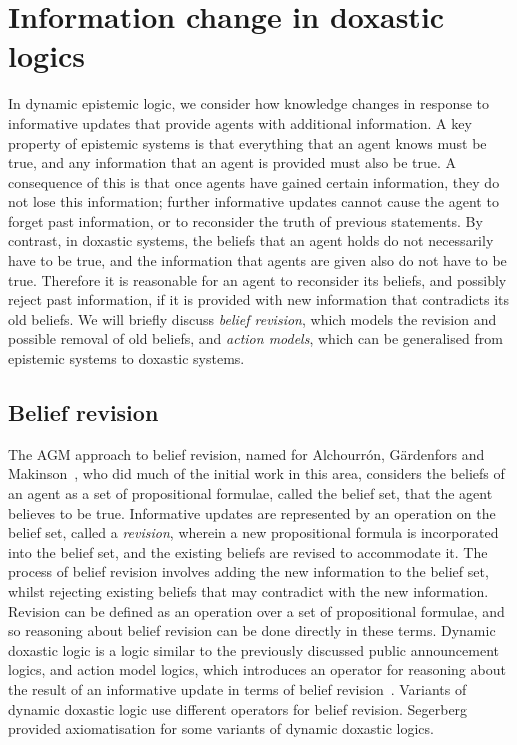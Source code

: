 \section{Information change in doxastic logics}

In dynamic epistemic logic, we consider how knowledge changes in response to
informative updates that provide agents with additional information. A key
property of epistemic systems is that everything that an agent knows must be
true, and any information that an agent is provided must also be true. A
consequence of this is that once agents have gained certain information, they do
not lose this information; further informative updates cannot cause the agent to
forget past information, or to reconsider the truth of previous statements. By
contrast, in doxastic systems, the beliefs that an agent holds do not
necessarily have to be true, and the information that agents are given also do
not have to be true. Therefore it is reasonable for an agent to reconsider its
beliefs, and possibly reject past information, if it is provided with new
information that contradicts its old beliefs. We will briefly discuss {\em
belief revision}, which models the revision and possible removal of old beliefs,
and {\em action models}, which can be generalised from epistemic systems to
doxastic systems.

\subsection{Belief revision}

The AGM approach to belief revision, named for Alchourrón, G{\"a}rdenfors and
Makinson~\cite{alchourron1985logic}, who did much of the initial work in this
area, considers the beliefs of an agent as a set of propositional formulae,
called the belief set, that the agent believes to be true. Informative updates
are represented by an operation on the belief set, called a {\em revision},
wherein a new propositional formula is incorporated into the belief set, and the
existing beliefs are revised to accommodate it. The process of belief revision
involves adding the new information to the belief set, whilst rejecting existing
beliefs that may contradict with the new information. Revision can be defined as
an operation over a set of propositional formulae, and so reasoning about belief
revision can be done directly in these terms. Dynamic doxastic logic is a logic
similar to the previously discussed public announcement logics, and action model
logics, which introduces an operator for reasoning about the result of an
informative update in terms of belief revision~\cite{vanditmarsch2007dynamic}.
Variants of dynamic doxastic logic use different operators for belief revision.
Segerberg~\cite{segerberg2001basic} provided axiomatisation for some variants of
dynamic doxastic logics.

